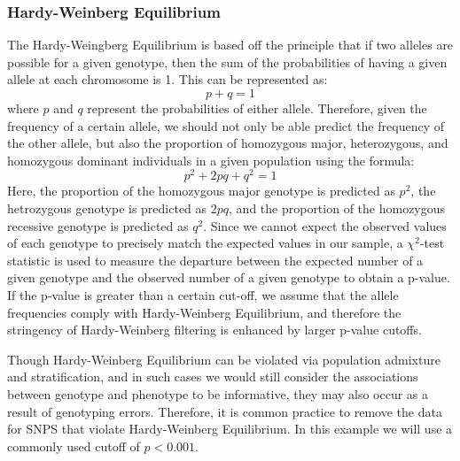 \documentclass[11pt]{article}\usepackage[]{graphicx}\usepackage[]{color}
\begin{document}
\subsubsection*{Hardy-Weinberg Equilibrium}
The Hardy-Weingberg Equilibrium is based off the principle that if two alleles are possible for a given genotype, then the sum of the probabilities of having a given allele at each chromosome is 1. This can be represented as:
$$p+q=1$$
where $p$ and $q$ represent the probabilities of either allele. Therefore, given the frequency of a certain allele, we should not only be able predict the frequency of the other allele, but also the proportion of homozygous major, heterozygous, and homozygous dominant individuals in a given population  using the formula:
$$p^2 +2pq+q^2=1$$
Here, the proportion of the homozygous major genotype is predicted as $p^2$, the hetrozygous genotype is predicted as $2pq$, and the proportion of the homozygous recessive genotype is predicted as $q^2$. Since we cannot expect the observed values of each genotype to precisely match the expected values in our sample, a $\chi^2$-test statistic is used to measure the departure between the expected number of a given genotype and the observed number of a given genotype to obtain a p-value.  If the p-value is greater than a certain cut-off, we assume that the allele frequencies comply with Hardy-Weinberg Equilibrium, and therefore the stringency of Hardy-Weinberg filtering is enhanced by larger p-value cutoffs.

  Though Hardy-Weinberg Equilibrium can be violated via population admixture and stratification, and in such cases we would still consider the associations between genotype and phenotype to be informative, they may also occur as a result of genotyping errors.  Therefore, it is common practice to remove the data for SNPS that violate Hardy-Weinberg Equilibrium. In this example we will use a commonly used cutoff of $p<0.001$.
\end{document}
